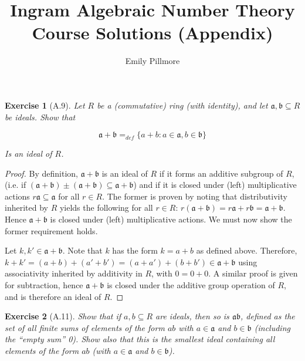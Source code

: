 \documentclass[12pt]{article}
\title{Ingram Algebraic Number Theory Course Solutions (Appendix)}
\author{Emily Pillmore}
\newtheorem{exercise}{Exercise}
\newcommand{\ia}{\mathfrak{a}}
\newcommand{\ib}{\mathfrak{b}}
\newcommand{\seq}{\subseteq}
\begin{document}
\maketitle

\begin{exercise}[A.9]
Let $R$ be a (commutative) ring (with identity), and let $\ia, \ib \seq R$ be ideals. Show that
	\begin{center}
		\begin{equation*}
			\ia + \ib =_{def}  \{ a + b :  a \in \ia, b \in \ib\} 
		\end{equation*}
	\end{center}
Is an ideal of $R$.
\end{exercise}
\begin{proof}
By definition, $\ia + \ib$ is an ideal of $R$ if it forms an additive subgroup of $R$, (i.e. if $(\ia + \ib) \pm (\ia + \ib) \seq \ia + \ib$) and if it is closed under (left) multiplicative actions $r\ia \seq \ia$ for all $r \in R$. The former is proven by noting that distributivity inherited by $R$ yields the following for all $r \in R$: $r(\ia + \ib) = r\ia + r\ib = \ia + \ib$. Hence $\ia + \ib$ is closed under (left) multiplicative actions. We must now show the former requirement holds. 

Let $k, k' \in \ia + \ib$. Note that $k$ has the form $k = a + b$ as defined above. Therefore, $k + k' = (a + b) + (a' + b') = (a + a') + (b + b') \in \ia + \ib$ using associativity inherited by additivity in $R$, with $0 = 0 + 0$. A similar proof is given for subtraction, hence $\ia + \ib$ is closed under the additive group operation of $R$, and is therefore an ideal of $R$.
\end{proof}

\begin{exercise}[A.11]
Show that if $a, b \seq R$ are ideals, then so is $\ia\ib$, defined as the set of all finite sums of elements of the form $ab$ with $a \in \ia$ and $b \in \ib$ (including the “empty sum” 0). Show also that this is the smallest ideal containing all elements of the form $ab$ (with $a \in \ia$ and $b \in \ib$).
\end{exercise}
\end{document}
